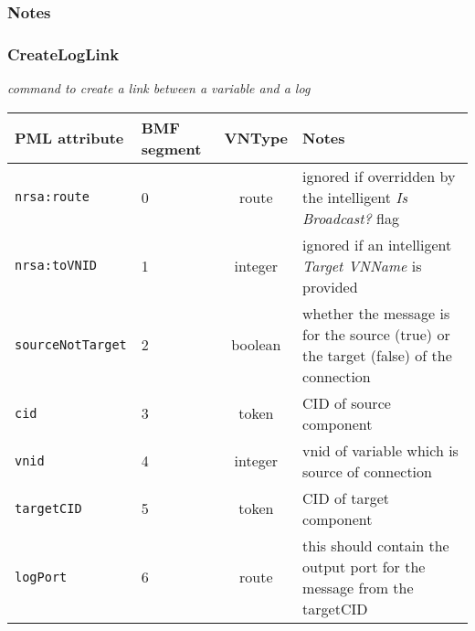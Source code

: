 \documentclass[pdftex,a4paper]{article}
\newcommand{\XMLfont}[1]{{\tt \small #1}}
\begin{document}
\subsubsection*{Notes}


\clearpage

\subsubsection{CreateLogLink}

{\em command to create a link between a variable and a log}

\begin{table}[!h]
  \begin{center}
    \label{tab:CreateLink}
    \begin{tabular}{|l|p{13mm}|c|p{60mm}|}
      \hline

      \textbf{PML attribute} & \textbf{BMF segment} & \textbf{VNType}
      & \textbf{Notes} \\\hline

      \XMLfont{nrsa:route} & 0 & route & ignored if overridden by the
      intelligent {\em Is Broadcast?} flag \\\hline

      \XMLfont{nrsa:toVNID} & 1 & integer & ignored if an intelligent {\em
      Target VNName} is provided \\\hline

      \XMLfont{sourceNotTarget} & 2 & boolean & whether the message is
      for the source (true) or the target (false) of the connection
      \\\hline

      \XMLfont{cid} & 3 & token & CID of source component
      \\\hline

      \XMLfont{vnid} & 4 & integer & vnid of variable which is source
      of connection \\\hline

      \XMLfont{targetCID} & 5 & token & CID of target component
      \\\hline

      \XMLfont{logPort} & 6 & route & this should contain the output
      port for the message from the targetCID \\\hline

    \end{tabular}
  \end{center}
\end{table}
\end{document}
